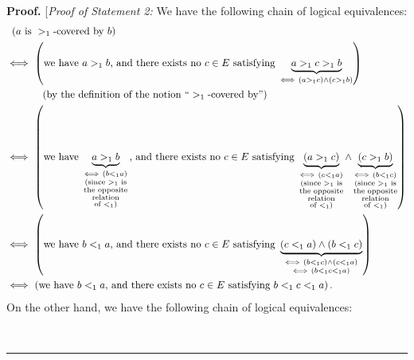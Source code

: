 \documentclass[numbers=enddot,12pt,final,onecolumn,notitlepage,abstracton]{scrartcl}
\theoremstyle{definition}
\newenvironment{proof}[1][Proof]{\noindent\textbf{#1.} }{\ \rule{0.5em}{0.5em}}
\newenvironment{verlong}{}{}
\begin{document}
\begin{verlong}
\begin{proof}
[\textit{Proof of Statement 2:} We have the following chain of logical
equivalences:%
\begin{align}
& \ \left(  a\text{ is }>_{1}\text{-covered by }b\right)  \nonumber\\
& \Longleftrightarrow\ \left(  \text{we have }a>_{1}b\text{, and there exists
no }c\in E\text{ satisfying }\underbrace{a>_{1}c>_{1}b}_{\Longleftrightarrow
\ \left(  a>_{1}c\right)  \wedge\left(  c>_{1}b\right)  }\right)  \nonumber\\
& \ \ \ \ \ \ \ \ \ \ \left(  \text{by the definition of the notion
\textquotedblleft}>_{1}\text{-covered by\textquotedblright}\right)
\nonumber\\
& \Longleftrightarrow\ \left(  \text{we have }\underbrace{a>_{1}%
b}_{\substack{\Longleftrightarrow~\left(  b<_{1}a\right)  \\\text{(since
}>_{1}\text{ is}\\\text{the opposite}\\\text{relation}\\\text{of }<_{1}\text{)}%
}}\text{, and there exists no }c\in E\text{ satisfying }\underbrace{\left(
a>_{1}c\right)  }_{\substack{\Longleftrightarrow~\left(  c<_{1}a\right)
\\\text{(since }>_{1}\text{ is}\\\text{the opposite}\\\text{relation}\\\text{of }%
<_{1}\text{)}}}\wedge\underbrace{\left(  c>_{1}b\right)  }%
_{\substack{\Longleftrightarrow~\left(  b<_{1}c\right)  \\\text{(since }%
>_{1}\text{ is}\\\text{the opposite}\\\text{relation}\\\text{of }<_{1}\text{)}%
}}\right)  \nonumber\\
& \Longleftrightarrow\ \left(  \text{we have }b<_{1}a\text{, and there exists
no }c\in E\text{ satisfying }\underbrace{\left(  c<_{1}a\right)  \wedge\left(
b<_{1}c\right)  }_{\substack{\Longleftrightarrow\ \left(  b<_{1}c\right)
\wedge\left(  c<_{1}a\right)  \\\Longleftrightarrow\ \left(  b<_{1}%
c<_{1}a\right)  }}\right)  \nonumber\\
& \Longleftrightarrow\ \left(  \text{we have }b<_{1}a\text{, and there exists
no }c\in E\text{ satisfying }b<_{1}c<_{1}a\right)
.\label{pf.lem.tertispecial.op.5}%
\end{align}
On the other hand, we have the following chain of logical equivalences:%

\end{proof}
\end{verlong}
\end{document}
